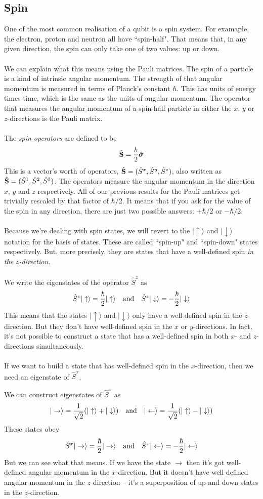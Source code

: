 \documentclass[12pt]{article}
\def\be{\begin{eqnarray}}
\def\ee{\end{eqnarray}}
\newcommand{\nn}{\nonumber}
\newcommand\para{\paragraph{}}
\newcommand\bsigma{\mbox{\boldmath $\sigma$}}
\newcommand{\co}{\color{olive}}
\newcommand{\upket}{|\uparrow\rangle}
\newcommand{\downket}{|\downarrow\rangle}
\newcommand{\rightket}{|\rightarrow\rangle}
\newcommand{\leftket}{|\leftarrow\rangle}
\begin{document}
{\subsection{Spin}


One of the most common realisation of a qubit is a spin system. For examaple, the electron, proton and neutron all have ``spin-half". That means that, in any given direction, the spin can only take one of two values: up or down.

\para
We can explain what this means using the Pauli matrices. The spin of a particle is a kind of intrinsic angular momentum. The strength of that angular momentum is measured in terms of Planck's constant $\hbar$. This has units of energy times time, which is the same as the units of angular momentum. The operator that measures the angular momentum of a spin-half particle in either the $x$, $y$ or $z$-directions is the Pauli matrix. 

\para
{\co The {\it spin operators} are defined to be
%
\be \hat{\bf S} = \frac{\hbar}{2}\hat{\bsigma}\nn\ee
%
This is a vector's worth of operators, $\hat{\bf S}=(\hat{S}^x,\hat{S}^y,\hat{S}^z)$, also written as $\hat{\bf S}=(\hat{S}^1,\hat{S}^2,\hat{S}^3)$.} The operators measure the angular momentum in the direction $x$, $y$ and $z$ respectively. All of our previous results for the Pauli matrices get trivially rescaled by that factor of $\hbar/2$. It means that if you ask for the value of the spin in any direction, there are just two possible answers: $+\hbar/2$ or $-\hbar/2$.



\para
Because we're dealing with spin states, we will revert to the $\upket$ and $\downket$ notation for the basis of states.  These are called ``spin-up" and ``spin-down" states respectively. But, more precisely, they are states that have a well-defined spin {\it in the} $z${\it -direction}. 

\para
{\co We write the eigenstates of the operator $\hat{S}^z$ as
%
\be \hat{S}^z\upket=\frac{\hbar}{2} \upket\ \ \ {\rm and}\ \ \ \hat{S}^z\downket = -\frac{\hbar}{2}\downket\nn\ee
%
} This means that the states $\upket$ and $\downket$ only have a well-defined spin in the $z$-direction. But they don't have well-defined spin in the $x$ or $y$-directions.  In fact, it's not possible to construct a state that has a well-defined spin in both $x$- and $z$-directions simultaneously. 

\para
If we want to build a state that has well-defined spin in the $x$-direction, then we need an eigenstate of $\hat{S}^x$. {\co We can construct eigenstates of $\hat{S}^x$ as
%
\be \rightket = \frac{1}{\sqrt{2}} (\upket + \downket) \ \ \ {\rm and}\ \ \ \leftket = \frac{1}{\sqrt{2}}(\upket-\downket)\nn\ee
%
These states obey
%
\be \hat{S}^x\rightket=\frac{\hbar}{2} \rightket\ \ \ {\rm and}\ \ \ \hat{S}^x\leftket = -\frac{\hbar}{2}\leftket\nn\ee
%
But we can see what that means. If we have the state $\rightarrow$ then it's got well-defined angular momentum in the $x$-direction. But it doesn't have well-defined angular momentum in the $z$-direction -- it's a superposition of up and down states in the $z$-direction. 

}}
\end{document}

